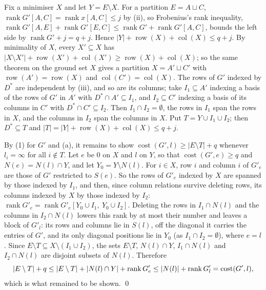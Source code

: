 \documentclass[11pt,letterpaper,reqno]{amsart}
\theoremstyle{spaced}
\begin{document}
Fix a minimiser \(X\) and let \(Y = E \setminus X\). For a partition \(E = A \sqcup C\), \(\operatorname{rank} G'[A, C] = \operatorname{rank} x[A, C] \le j\) by (ii), so Frobenius's rank inequality, \(\operatorname{rank} G'[A, E] + \operatorname{rank} G'[E, C] \le \operatorname{rank} G' + \operatorname{rank} G'[A, C]\), bounds the left side by \(\operatorname{rank} G' + j = q + j\). Hence \(\lvert Y\rvert + \operatorname{row}(X) + \operatorname{col}(X) \le q + j\). By minimality of \(X\), every \(X' \subseteq X\) has \(\lvert X \setminus X'\rvert + \operatorname{row}(X') + \operatorname{col}(X') \ge \operatorname{row}(X) + \operatorname{col}(X)\); so the same theorem on the ground set \(X\) gives a partition \(X = A' \sqcup C'\) with \(\operatorname{row}(A') = \operatorname{row}(X)\) and \(\operatorname{col}(C') = \operatorname{col}(X)\). The rows of \(G'\) indexed by \(D^*\) are independent by (iii), and so are its columns; take \(I_1 \subseteq A'\) indexing a basis of the rows of \(G'\) in \(A'\) with \(D^* \cap A' \subseteq I_1\), and \(I_2 \subseteq C'\) indexing a basis of its columns in \(C'\) with \(D^* \cap C' \subseteq I_2\). Then \(I_1 \cap I_2 = \emptyset\), the rows in \(I_1\) span the rows in \(X\), and the columns in \(I_2\) span the columns in \(X\). Put \(T = Y \cup I_1 \cup I_2\); then \(D^* \subseteq T\) and \(\lvert T\rvert = \lvert Y\rvert + \operatorname{row}(X) + \operatorname{col}(X) \le q + j\).

\begingroup{} By (1) for \(G'\) and (a), it remains to show \(\operatorname{cost}(G', l) \ge \lvert E \setminus T\rvert + q\) whenever \(l_i = \infty\) for all \(i \notin T\). Let \(e\) be \(0\) on \(X\) and \(l\) on \(Y\), so that \(\operatorname{cost}(G', e) \ge q\) and \(N(e) = N(l) \cap Y\), and let \(Y_0 = Y \setminus N(l)\). For \(i \in X\), row \(i\) and column \(i\) of \(G'_e\) are those of \(G'\) restricted to \(S(e)\). So the rows of \(G'_e\) indexed by \(X\) are spanned by those indexed by \(I_1\), and then, since column relations survive deleting rows, its columns indexed by \(X\) by those indexed by \(I_2\): \(\operatorname{rank} G'_e = \operatorname{rank} G'_e[Y_0 \cup I_1,\ Y_0 \cup I_2]\). Deleting the rows in \(I_1 \cap N(l)\) and the columns in \(I_2 \cap N(l)\) lowers this rank by at most their number and leaves a block of \(G'_l\): its rows and columns lie in \(S(l)\), off the diagonal it carries the entries of \(G'\), and its only diagonal positions lie in \(Y_0\) (as \(I_1 \cap I_2 = \emptyset\)), where \(e = l\). Since \(E \setminus T \subseteq X \setminus (I_1 \cup I_2)\), the sets \(E \setminus T\), \(N(l) \cap Y\), \(I_1 \cap N(l)\) and \(I_2 \cap N(l)\) are disjoint subsets of \(N(l)\). Therefore
\[\lvert E \setminus T\rvert + q \le \lvert E \setminus T\rvert + \lvert N(l) \cap Y\rvert + \operatorname{rank} G'_e \le \lvert N(l)\rvert + \operatorname{rank} G'_l = \operatorname{cost}(G', l),\postdisplaypenalty=10000 \]
which is what remained to be shown. \qed\par\endgroup
\end{document}
